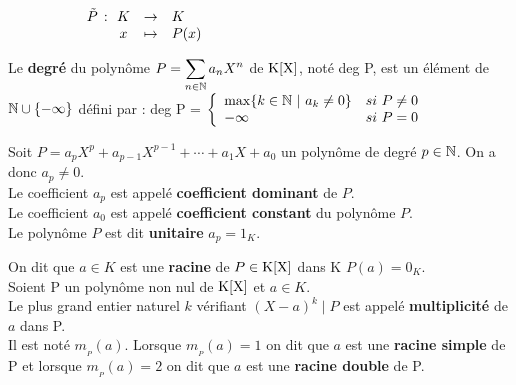 \vspace{-0.45cm}

\(\begin{array}{rccl}
    \hspace{1.8cm} \Tilde{P}\, : &\!\! K & \to & K \\
     &\!\! x & \mapsto & P(x) 
\end{array}
\)

\vspace{1.5cm}

Le \textbf{degré} du polynôme \(\displaystyle P = \sum _{n\in \mathbb{N}}a_nX^n \) de $\text{K}[\text{X}]$, noté deg P, est un élément de \(\mathbb{N}\cup \{-\infty\}\) défini par : deg P = \(\left\{ \begin{array}{lc}
     \max \{ k\in \mathbb{N} \ | \ a_k \neq 0 \} & si\ P\neq 0 \\
     -\infty & si\ P= 0
\end{array} \right.\) 

\vspace{1cm}

Soit \(P=a_pX^p+a_{p-1}X^{p-1}+\cdots+a_1X+a_0  \) un polynôme de degré \(p\in \mathbb{N}\). On a donc \(a_p\neq 0\).\vspace{0.1cm}\\
Le coefficient \(a_p\) est appelé \textbf{coefficient dominant} de \(P\).\\
Le coefficient \(a_0\) est appelé \textbf{coefficient constant} du polynôme \(P\).\vspace{0.1cm}\\
Le polynôme \(P\) est dit \textbf{unitaire} \ssi \(a_p=1_K\).

\vspace{1cm}

\noindent On dit que \(a\in K\) est une \textbf{racine} de \(P\in \text{K}[\text{X}]\) dans K \ssi \(P(a)=0_K.\) \vspace{0.5cm}\\
Soient P un polynôme non nul de $\text{K}[\text{X}]$ et \(a\in K.\)\vspace{0.1cm}\\
Le plus grand entier naturel $k$ vérifiant \((X-a)^k\mid P\) est appelé \textbf{multiplicité} de \(a\) dans P.\\
Il est noté \(m_{_P}(a)\). Lorsque \(m_{_P}(a)=1\) on dit que \(a\) est une \textbf{racine simple} de P et lorsque \(m_{_P}(a)=2\) on dit que \(a\) est une \textbf{racine double} de P. 

